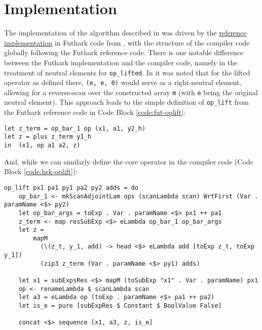 \documentclass{article}
\newenvironment{code}{\captionsetup{type=listing}}{}
\begin{document}
\section{Implementation}
The implementation of the algorithm described in \cite{PPAD} was driven by the \href{https://github.com/diku-dk/ifl23-revad-red-scan/blob/main/scan/scan-adj-comp.fut}{reference implementation} in Futhark code from \cite{Futhark}, with the structure of the compiler code globally following the Futhark reference code. There is one notable difference between the Futhark implementation and the compiler code, namely in the treatment of neutral elements for \lstinline{op_lifted}. In \cite{PPAD} it was noted that for the lifted operator as defined there, \lstinline{(e, e, 0)} would serve as a right-neutral element, allowing for a reverse-scan over the constructed array \lstinline{m} (with \lstinline{e} being the original neutral element). This approach leads to the simple definition of \lstinline{op_lift} from the Futhark reference code in Code Block \ref{code:fut-oplift}:
\begin{code}
	\begin{verbatim}
let z_term = op_bar_1 op (x1, a1, y2_h)
let z = plus z_term y1_h
in  (x1, op a1 a2, z)
\end{verbatim}
	\caption{Reference Futhark code for \lstinline{op_lift} (operator for scan calculating adjoints for scan intermediates rs/xs). \lstinline{op_bar_1} refers to differentiating \lstinline{op} with respect to its first argument.\\}
	\label{code:fut-oplift}
\end{code}
And, while we can similarly define the core operator in the compiler code (Code Block \ref{code:hsk-oplift}):
\begin{code}
	\begin{verbatim}
op_lift px1 pa1 py1 pa2 py2 adds = do
    op_bar_1 <- mkScanAdjointLam ops (scanLambda scan) WrtFirst (Var . paramName <$> py2)
    let op_bar_args = toExp . Var . paramName <$> px1 ++ pa1
    z_term <- map resSubExp <$> eLambda op_bar_1 op_bar_args
    let z =
        mapM
          (\(z_t, y_1, add) -> head <$> eLambda add [toExp z_t, toExp y_1])
          (zip3 z_term (Var . paramName <$> py1) adds)
    
    let x1 = subExpsRes <$> mapM (toSubExp "x1" . Var . paramName) px1
    op <- renameLambda $ scanLambda scan
    let a3 = eLambda op (toExp . paramName <$> pa1 ++ pa2)
    let is_e = pure [subExpRes $ Constant $ BoolValue False]
    
    concat <$> sequence [x1, a3, z, is_e]
\end{verbatim}
	\caption{Haskell code for \lstinline{op_lift} (operator for scan calculating adjoints for scan intermediates rs/xs)\\}
	\label{code:hsk-oplift}
\end{code}
\end{document}
